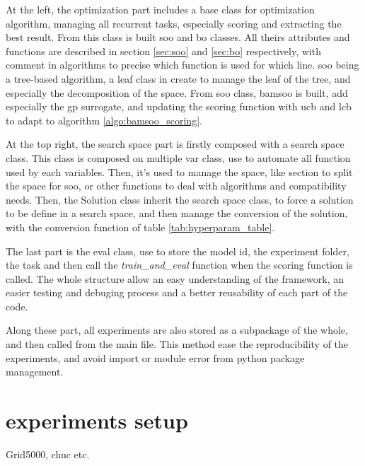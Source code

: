 At the left, the optimization part includes a base class for optimization algorithm, managing all recurrent tasks, especially scoring and extracting the best result. From this class is built \acrshort{soo} and \acrshort{bo} classes. All theirs attributes and functions are described in section \ref{sec:soo} and \ref{sec:bo} respectively, with comment in algorithms to precise which function is used for which line. \acrshort{soo} being a tree-based algorithm, a leaf class in create to manage the leaf of the tree, and especially the decomposition of the space. From \acrshort{soo} class, \acrshort{bamsoo} is built, add especially the \acrshort{gp} surrogate, and updating the scoring function with \acrshort{ucb} and \acrshort{lcb} to adapt to algorithm \ref{algo:bamsoo_scoring}.

At the top right, the search space part is firstly composed with a search space class. This class is composed on multiple var class, use to automate all function used by each variables. Then, it's used to manage the space, like section to split the space for \acrshort{soo}, or other functions to deal with algorithms and compatibility needs. Then, the Solution class inherit the search space class, to force a solution to be define in a search space, and then manage the conversion of the solution, with the conversion function of table \ref{tab:hyperparam_table}.

The last part is the eval class, use to store the model id, the experiment folder, the task and then call the \textit{train\_and\_eval} function when the scoring function is called. The whole structure allow an easy understanding of the framework, an easier testing and debuging process and a better reusability of each part of the code. 

Along these part, all experiments are also stored as a subpackage of the whole, and then called from the main file. This method ease the reproducibility of the experiments, and avoid import or module error from python package management. 

\section{experiments setup}
\label{sec:exp_setup}

Grid5000, chuc etc.



